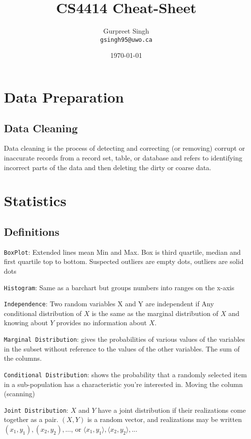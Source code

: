 \documentclass[10pt,landscape,a4paper]{cheatsheet}
\title{CS4414 Cheat-Sheet}
\author{Gurpreet Singh\\\texttt{gsingh95@uwo.ca}}
\date{\today}
\begin{document}
  \maketitle
  \section{Data Preparation}

  \subsection{Data Cleaning}
  Data cleaning is the process of detecting and correcting (or removing) corrupt or inaccurate records
  from a record set, table, or database and refers to identifying incorrect parts of the data and then deleting the dirty or coarse data.

  \section{Statistics}

  \subsection{Definitions}
  \texttt{BoxPlot}: Extended lines mean Min and Max. Box is third quartile, median and first quartile top to bottom. Suspected outliers are empty dots, outliers are solid dots\newline

  \texttt{Histogram}: Same as a barchart but groups numbers into ranges on the x-axis\newline

  \texttt{Independence}: Two random variables X and Y are independent if Any conditional distribution of $X$ is the same as the marginal distribution of $X$ and knowing about $Y$ provides no information about $X$.\newline

  \texttt{Marginal Distribution}: gives the probabilities of various values of the variables in the subset without reference to the values of the other variables. The sum of the columns.\newline

  \texttt{Conditional Distribution}: shows the probability that a randomly selected item in a sub-population has a characteristic you're interested in. Moving the column (scanning)\newline 
 
  \texttt{Joint Distribution}: $X$ and $Y$ have a joint distribution if their realizations come together as a pair. $(X,Y)$ is a random vector, and realizations may be written $(x_1,y_1), (x_2,y_2), ...$, or $\langle x_1, y_1 \rangle, \langle x_2, y_2 \rangle, ...$ \newline
\end{document}
